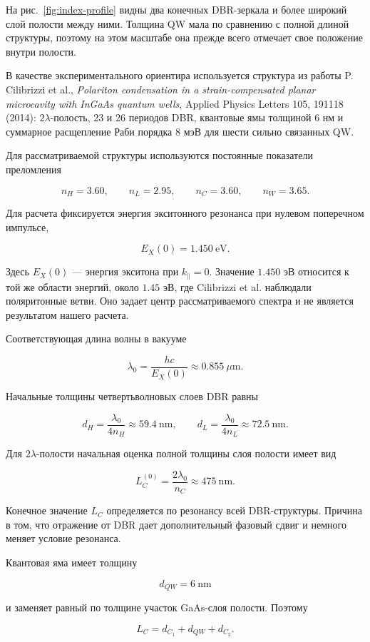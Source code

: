 \documentclass[12pt,a4paper]{article}
\begin{document}
На рис.~\ref{fig:index-profile} видны два конечных DBR-зеркала и более широкий слой полости между ними. Толщина QW мала по сравнению с полной длиной структуры, поэтому на этом масштабе она прежде всего отмечает свое положение внутри полости.

В качестве экспериментального ориентира используется структура из работы P. Cilibrizzi et al., \textit{Polariton condensation in a strain-compensated planar microcavity with InGaAs quantum wells}, Applied Physics Letters 105, 191118 (2014): $2\lambda$-полость, 23 и 26 периодов DBR, квантовые ямы толщиной $6$ нм и суммарное расщепление Раби порядка $8$ мэВ для шести сильно связанных QW.

Для рассматриваемой структуры используются постоянные показатели преломления

\[
n_H=3.60,\qquad n_L=2.95,\qquad n_C=3.60,\qquad n_W=3.65.
\]

Для расчета фиксируется энергия экситонного резонанса при нулевом поперечном импульсе,

\[
E_X(0)=1.450\ \mathrm{eV}.
\]

Здесь $E_X(0)$ --- энергия экситона при $k_\parallel=0$. Значение $1.450$ эВ относится к той же области энергий, около $1.45$ эВ, где Cilibrizzi et al. наблюдали поляритонные ветви. Оно задает центр рассматриваемого спектра и не является результатом нашего расчета.

Соответствующая длина волны в вакууме

\[
\lambda_0=\frac{hc}{E_X(0)}\approx0.855\ \mu\mathrm m.
\]

Начальные толщины четвертьволновых слоев DBR равны

\[
d_H=\frac{\lambda_0}{4n_H}\approx59.4\ \mathrm{nm},
\qquad
 d_L=\frac{\lambda_0}{4n_L}\approx72.5\ \mathrm{nm}.
\]

Для $2\lambda$-полости начальная оценка полной толщины слоя полости имеет вид

\[
L_C^{(0)}=\frac{2\lambda_0}{n_C}\approx475\ \mathrm{nm}.
\]

Конечное значение $L_C$ определяется по резонансу всей DBR-структуры. Причина в том, что отражение от DBR дает дополнительный фазовый сдвиг и немного меняет условие резонанса.

Квантовая яма имеет толщину

\[
d_{QW}=6\ \mathrm{nm}
\]

и заменяет равный по толщине участок GaAs-слоя полости. Поэтому

\[
L_C=d_{C_1}+d_{QW}+d_{C_2}.
\]
\end{document}
